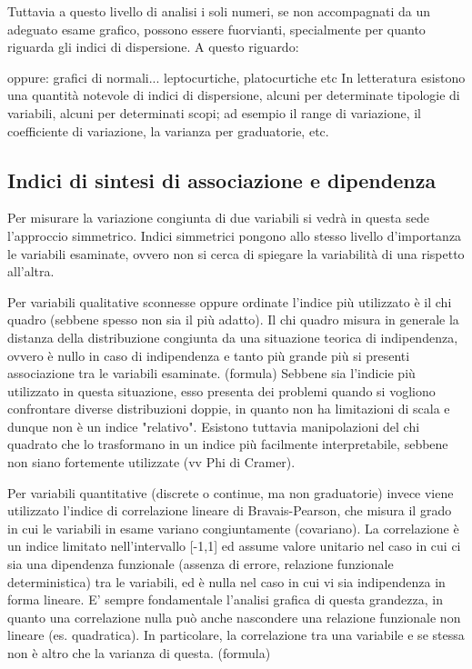 \documentclass[a4paper]{article}
\begin{document}
Tuttavia a questo livello di analisi i soli numeri, se non accompagnati da un adeguato esame grafico, possono essere fuorvianti, specialmente per quanto riguarda gli indici di dispersione. A questo riguardo:




oppure:
grafici di normali... leptocurtiche, platocurtiche etc
In letteratura esistono una quantit\`{a} notevole di indici di dispersione, alcuni per determinate tipologie di variabili, alcuni per determinati scopi; ad esempio il range di variazione, il coefficiente di variazione, la varianza per graduatorie, etc.

\subsection{Indici di sintesi di associazione e dipendenza}

Per misurare la variazione congiunta di due variabili si vedr\`{a} in questa sede l'approccio simmetrico.
Indici simmetrici pongono allo stesso livello d'importanza le variabili esaminate, ovvero non si cerca di spiegare la variabilit\`{a} di una rispetto all'altra.

Per variabili qualitative sconnesse oppure ordinate l'indice più utilizzato \`{e} il chi quadro (sebbene spesso non sia il più adatto). Il chi quadro misura in generale la distanza della distribuzione congiunta da una situazione teorica di indipendenza, ovvero \`{e} nullo in caso di indipendenza e tanto più grande più si presenti associazione tra le variabili esaminate.
(formula)
Sebbene sia l'indicie più utilizzato in questa situazione, esso presenta dei problemi quando si vogliono confrontare diverse distribuzioni doppie, in quanto non ha limitazioni di scala e dunque non \`{e} un indice "relativo". Esistono tuttavia manipolazioni del chi quadrato che lo trasformano in un indice più facilmente interpretabile, sebbene non siano fortemente utilizzate (vv Phi di Cramer).

Per variabili quantitative (discrete o continue, ma non graduatorie) invece viene utilizzato l'indice di correlazione lineare di Bravais-Pearson, che misura il grado in cui le variabili in esame variano congiuntamente (covariano).
La correlazione \`{e} un indice limitato nell'intervallo [-1,1] ed assume valore unitario nel caso in cui ci sia una dipendenza funzionale (assenza di errore, relazione funzionale deterministica) tra le variabili, ed \`{e} nulla nel caso in cui vi sia indipendenza in forma lineare. E' sempre fondamentale l'analisi grafica di questa grandezza, in quanto una correlazione nulla può anche nascondere una relazione funzionale non lineare (es. quadratica). In particolare, la correlazione tra una variabile e se stessa non \`{e} altro che la varianza di questa.
(formula)
\end{document}
